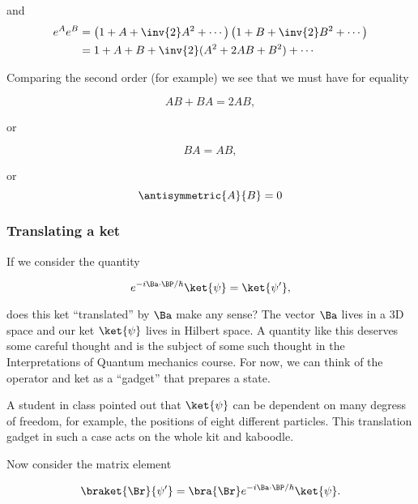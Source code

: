 and 
\begin{equation}\label{eqn:qmTwoL11:130}
\begin{aligned}
e^A e^B 
&= 
\left(1 + A + \inv{2}A^2 + \cdots\right)
\left(1 + B + \inv{2}B^2 + \cdots\right) \\
&= 1 + A + B + \inv{2}( A^2 + 2 A B + B^2 ) + \cdots
\end{aligned}
\end{equation}

Comparing the second order (for example) we see that we must have for equality

\begin{equation}\label{eqn:qmTwoL11:150}
A B + B A = 2 A B,
\end{equation}

or

\begin{equation}\label{eqn:qmTwoL11:170}
B A = A B,
\end{equation}

or
\begin{equation}\label{eqn:qmTwoL11:190}
\antisymmetric{A}{B} = 0
\end{equation}

\subsubsection{Translating a ket}

If we consider the quantity

\begin{equation}\label{eqn:qmTwoL11:210}
e^{-i \Ba \cdot \BP/\hbar} 
\ket{\psi} = \ket{\psi'} ,
\end{equation}

does this ket ``translated'' by $\Ba$ make any sense?  The vector $\Ba$ lives in a 3D space and our ket $\ket{\psi}$ lives in Hilbert space.  A quantity like this deserves some careful thought and is the subject of some such thought in the Interpretations of Quantum mechanics course.  For now, we can think of the operator and ket as a ``gadget'' that prepares a state.

A student in class pointed out that $\ket{\psi}$ can be dependent on many degress of freedom, for example, the positions of eight different particles.  This translation gadget in such a case acts on the whole kit and kaboodle.

Now consider the matrix element

\begin{equation}\label{eqn:qmTwoL11:230}
\braket{\Br}{\psi'} 
= \bra{\Br} e^{-i \Ba \cdot \BP/\hbar} \ket{\psi}.
\end{equation}

